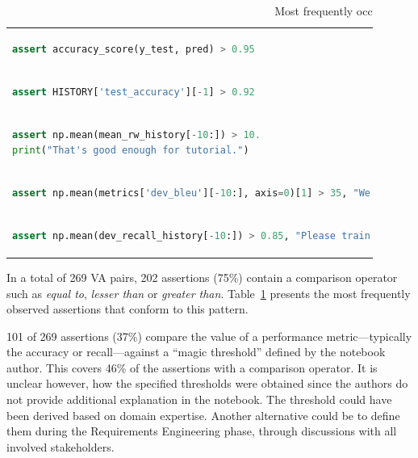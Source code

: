 \begin{table}
  \centering
  \caption{Most frequently occurring assertions that use a comparison operator.}
  \begin{tabular}{@{}m{0.9\linewidth}@{}}
    \toprule
    \begin{lstlisting}[language=Python,belowskip=0pt,aboveskip=0pt]
assert accuracy_score(y_test, pred) > 0.95\end{lstlisting}\\
    \begin{lstlisting}[language=Python,belowskip=0pt,aboveskip=0pt]
assert HISTORY['test_accuracy'][-1] > 0.92\end{lstlisting}\\
    \begin{lstlisting}[language=Python,belowskip=0pt,aboveskip=0pt]
assert np.mean(mean_rw_history[-10:]) > 10.
print("That's good enough for tutorial.")\end{lstlisting}\\
    \begin{lstlisting}[language=Python,belowskip=0pt,aboveskip=0pt]
assert np.mean(metrics['dev_bleu'][-10:], axis=0)[1] > 35, "We kind of need a higher bleu BLEU from you. Kind of right now."\end{lstlisting}\\
    \begin{lstlisting}[language=python,belowskip=0pt,aboveskip=0pt]
assert np.mean(dev_recall_history[-10:]) > 0.85, "Please train for at least 85% recall on test set. You may need to change vectorizer model for that."
    \end{lstlisting}\\
    \bottomrule
  \end{tabular}
  \label{tab:compare-op-asserts}
\end{table}

In a total of 269 VA pairs, 202 assertions (75\%) contain a comparison operator such as \emph{equal to}, \emph{lesser than} or \emph{greater than}. Table~\ref{tab:compare-op-asserts} presents the most frequently observed assertions that conform to this pattern.

101 of 269 assertions (37\%) compare the value of a performance metric---typically the accuracy or recall---against a ``magic threshold'' defined by the notebook author. This covers 46\% of the assertions with a comparison operator. It is unclear however, how the specified thresholds were obtained since the authors do not provide additional explanation in the notebook. The threshold could have been derived based on domain expertise. Another alternative could be to define them during the Requirements Engineering phase, through discussions with all involved stakeholders\cite{vogelsang2019requirements,rahimi2019toward}.

